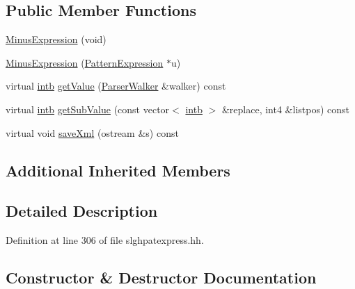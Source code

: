 \subsection*{Public Member Functions}
\begin{DoxyCompactItemize}
\item 
\mbox{\hyperlink{class_minus_expression_abd1a3253d44f9cf862212e1b481ed464}{Minus\+Expression}} (void)
\item 
\mbox{\hyperlink{class_minus_expression_a8a406fc5373837aa4aeb7baa99bbe881}{Minus\+Expression}} (\mbox{\hyperlink{class_pattern_expression}{Pattern\+Expression}} $\ast$u)
\item 
virtual \mbox{\hyperlink{types_8h_aa925ba3e627c2df89d5b1cfe84fb8572}{intb}} \mbox{\hyperlink{class_minus_expression_a70ffca1486be90676a669b34e9b3b6be}{get\+Value}} (\mbox{\hyperlink{class_parser_walker}{Parser\+Walker}} \&walker) const
\item 
virtual \mbox{\hyperlink{types_8h_aa925ba3e627c2df89d5b1cfe84fb8572}{intb}} \mbox{\hyperlink{class_minus_expression_a8abb994d8568893e03dd5ddfc7fc026a}{get\+Sub\+Value}} (const vector$<$ \mbox{\hyperlink{types_8h_aa925ba3e627c2df89d5b1cfe84fb8572}{intb}} $>$ \&replace, int4 \&listpos) const
\item 
virtual void \mbox{\hyperlink{class_minus_expression_a3edf1546b4d4161e68ed8151654a9b9b}{save\+Xml}} (ostream \&s) const
\end{DoxyCompactItemize}
\subsection*{Additional Inherited Members}


\subsection{Detailed Description}


Definition at line 306 of file slghpatexpress.\+hh.



\subsection{Constructor \& Destructor Documentation}
\mbox{\label{class_minus_expression_abd1a3253d44f9cf862212e1b481ed464}} 
